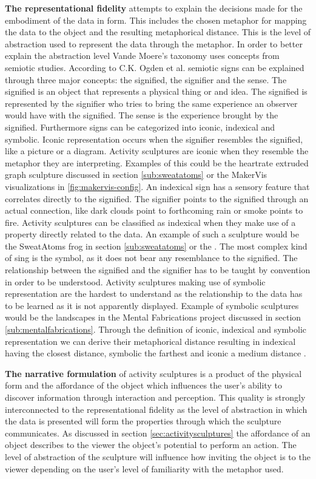 \documentclass[../medieninformatik-arbeit.tex]{subfiles}
\begin{document}
\textbf{The representational fidelity} attempts to explain the decisions made for the embodiment of the data in form. This includes the chosen metaphor for mapping the data to the object and the resulting metaphorical distance. This is the level of abstraction used to represent the data through the metaphor. In order to better explain the abstraction level Vande Moere's taxonomy uses concepts from semiotic studies. According to C.K. Ogden et al. \cite{ogden1946meaning} semiotic signs can be explained through three major concepts: the signified, the signifier and the sense. The signified is an object that represents a physical thing or and idea. The signified is represented by the signifier who tries to bring the same experience an observer would have with the signified. The sense is the experience brought by the signified. Furthermore signs can be categorized into iconic, indexical and symbolic. Iconic representation occurs when the signifier resembles the signified, like a picture or a diagram. Activity sculptures are iconic when they resemble the metaphor they are interpreting. Examples of this could be the heartrate extruded graph sculpture discussed in section \ref{sub:sweatatoms} or the MakerVis visualizations in \ref{fig:makervis-config}. An indexical sign has a sensory feature that correlates directly to the signified. The signifier points to the signified through an actual connection, like dark clouds point to forthcoming rain or smoke points to fire. Activity sculptures can be classified as indexical when they make use of a property directly related to the data. An example of such a sculpture would be the SweatAtoms frog in section \ref{sub:sweatatoms} or the . The most complex kind of sing is the symbol, as it does not bear any resemblance to the signified. The relationship between the signified and the signifier has to be taught by convention in order to be understood. Activity sculptures making use of symbolic representation are the hardest to understand as the relationship to the data has to be learned as it is not apparently displayed. Example of symbolic sculptures would be the landscapes in the Mental Fabrications project discussed in section \ref{sub:mentalfabrications}. Through the definition of iconic, indexical and symbolic representation we can derive their metaphorical distance resulting in indexical having the closest distance, symbolic the farthest and iconic a medium distance \cite{swaminathan2014supporting}. 

\textbf{The narrative formulation} of activity sculptures is a product of the physical form and the affordance of the object which influences the user's ability to discover information through interaction and perception. This quality is strongly interconnected to the representational fidelity as the level of abstraction in which the data is presented will form the properties through which the sculpture communicates. As discussed in section \ref{sec:activitysculptures} the affordance of an object describes to the viewer the object's potential to perform an action. The level of abstraction of the sculpture will influence how inviting the object is to the viewer depending on the user's level of familiarity with the metaphor used. 
\end{document}

